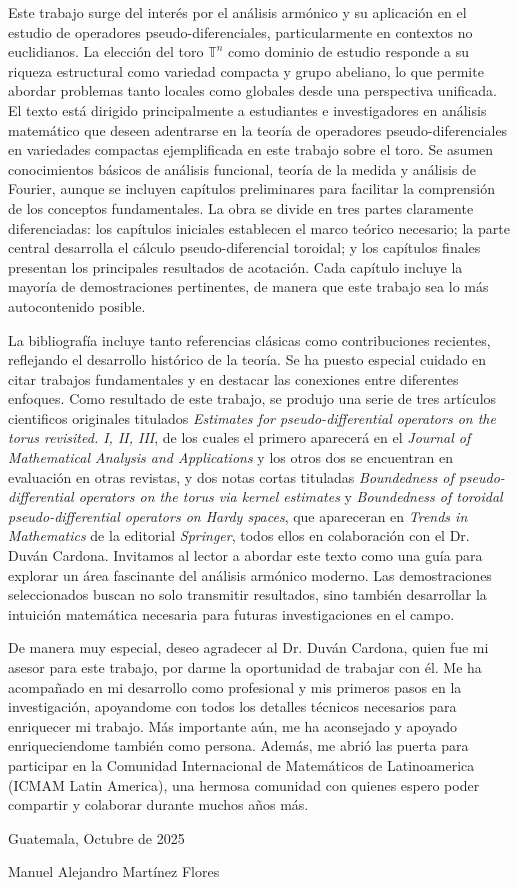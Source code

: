 
Este trabajo surge del interés por el análisis armónico y su aplicación en el estudio de operadores pseudo-diferenciales, particularmente en contextos no euclidianos. La elección del toro $\mathbb{T}^n$ como dominio de estudio responde a su riqueza estructural como variedad compacta y grupo abeliano, lo que permite abordar problemas tanto locales como globales desde una perspectiva unificada. El texto está dirigido principalmente a estudiantes e investigadores en análisis matemático que deseen adentrarse en la teoría de operadores pseudo-diferenciales en variedades compactas ejemplificada en este trabajo sobre el toro. Se asumen conocimientos básicos de análisis funcional, teoría de la medida y análisis de Fourier, aunque se incluyen capítulos preliminares para facilitar la comprensión de los conceptos fundamentales. La obra se divide en tres partes claramente diferenciadas: los capítulos iniciales establecen el marco teórico necesario; la parte central desarrolla el cálculo pseudo-diferencial toroidal; y los capítulos finales presentan los principales resultados de acotación. Cada capítulo incluye la mayoría de demostraciones pertinentes, de manera que este trabajo sea lo más autocontenido posible.


La bibliografía incluye tanto referencias clásicas como contribuciones recientes, reflejando el desarrollo histórico de la teoría. Se ha puesto especial cuidado en citar trabajos fundamentales y en destacar las conexiones entre diferentes enfoques. Como resultado de este trabajo, se produjo una serie de tres artículos cientificos originales titulados \textit{Estimates for pseudo-differential operators on the torus revisited. I, II, III}, de los cuales el primero aparecerá en el \textit{Journal of Mathematical Analysis and Applications} y los otros dos se encuentran en evaluación en otras revistas, y dos notas cortas tituladas \textit{Boundedness of pseudo-differential operators on the torus via kernel estimates} y \textit{Boundedness of toroidal pseudo-differential operators on Hardy spaces}, que apareceran en \textit{Trends in Mathematics} de la editorial \textit{Springer}, todos ellos en colaboración con el Dr. Duván Cardona. Invitamos al lector a abordar este texto como una guía para explorar un área fascinante del análisis armónico moderno. Las demostraciones seleccionados buscan no solo transmitir resultados, sino también desarrollar la intuición matemática necesaria para futuras investigaciones en el campo.


De manera muy especial, deseo agradecer al Dr. Duván Cardona, quien fue mi asesor para este trabajo, por darme la oportunidad de trabajar con él. Me ha acompañado en mi desarrollo como profesional y mis primeros pasos en la investigación, apoyandome con todos los detalles técnicos necesarios para enriquecer mi trabajo. Más importante aún, me ha aconsejado y apoyado enriqueciendome también como persona. Además, me abrió las puerta para participar en la Comunidad Internacional de Matemáticos de Latinoamerica (ICMAM Latin America), una hermosa comunidad con quienes espero poder compartir y colaborar durante muchos años más. 

Guatemala, Octubre de 2025

Manuel Alejandro Martínez Flores